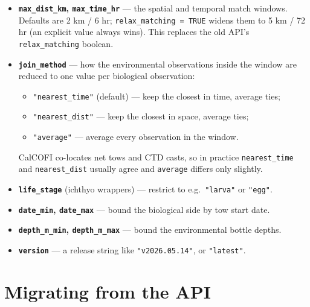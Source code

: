 \documentclass[
  letterpaper,
  DIV=11,
  numbers=noendperiod]{scrreprt}
\providecommand{\tightlist}{%
  \setlength{\itemsep}{0pt}\setlength{\parskip}{0pt}}
\begin{document}
\begin{itemize}
\tightlist
\item
  \textbf{\texttt{max\_dist\_km}, \texttt{max\_time\_hr}} --- the
  spatial and temporal match windows. Defaults are 2 km / 6 hr;
  \texttt{relax\_matching\ =\ TRUE} widens them to 5 km / 72 hr (an
  explicit value always wins). This replaces the old API's
  \texttt{relax\_matching} boolean.
\item
  \textbf{\texttt{join\_method}} --- how the environmental observations
  inside the window are reduced to one value per biological observation:

  \begin{itemize}
  \tightlist
  \item
    \texttt{"nearest\_time"} (default) --- keep the closest in time,
    average ties;
  \item
    \texttt{"nearest\_dist"} --- keep the closest in space, average
    ties;
  \item
    \texttt{"average"} --- average every observation in the window.
  \end{itemize}

  CalCOFI co-locates net tows and CTD casts, so in practice
  \texttt{nearest\_time} and \texttt{nearest\_dist} usually agree and
  \texttt{average} differs only slightly.
\item
  \textbf{\texttt{life\_stage}} (ichthyo wrappers) --- restrict to
  e.g.~\texttt{"larva"} or \texttt{"egg"}.
\item
  \textbf{\texttt{date\_min}, \texttt{date\_max}} --- bound the
  biological side by tow start date.
\item
  \textbf{\texttt{depth\_m\_min}, \texttt{depth\_m\_max}} --- bound the
  environmental bottle depths.
\item
  \textbf{\texttt{version}} --- a release string like
  \texttt{"v2026.05.14"}, or \texttt{"latest"}.
\end{itemize}

\section{Migrating from the API}\label{migrating-from-the-api}
\end{document}
